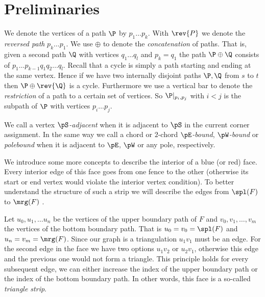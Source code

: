 
\section{Preliminaries}

  We denote the vertices of a path $\P$ by $p_1 \ldots p_k$.
  With $\rev{P}$ we denote the \emph{reversed path} $p_k \ldots p_1$. We use $\oplus$ to denote the \emph{concatenation} of paths. That is, given a second path $\Q$ with vertices $q_1 \ldots q_l$ and $p_k = q_1$ the path $\P \oplus \Q$ consists of $p_1 \ldots p_{k-1} q_1 q_2 \ldots q_l$.
  Recall that a cycle is simply a path starting and ending at the same vertex. Hence if we have two  internally disjoint paths $\P, \Q$ from $s$ to $t$ then $\P \oplus \rev{\Q}$ is a cycle.
  Furthermore we use a vertical bar to denote the \emph{restriction} of a path to a certain set of vertices. So $\P|_{p_i, p_j}$ with $i<j$ is the subpath of $\P$ with vertices $p_i \ldots p_j$.

  We call a vertex \emph{$\pS$-adjacent} when it is adjacent to $\pS$ in the current corner assignment. In the same way we call a chord or $2$-chord \emph{$\pE$-bound}, \emph{$\pW$-bound} or \emph{polebound} when it is adjacent to $\pE$, $\pW$ or any pole,  respectively.

  We introduce some more concepts to describe the interior of a blue (or red) face. Every interior edge of this face goes from one fence to the other (otherwise its start or end vertex would violate the interior vertex condition). To better understand the structure of such a strip we will describe the edges from $\spl(F)$ to $\mrg(F)$ .

  Let $u_0 , u_1, \ldots u_n$ be the vertices of the upper boundary path of $F$ and $v_0, v_1, \ldots, v_m$ the vertices of the bottom boundary path. That is $u_0=v_0 = \spl(F)$ and $u_n = v_m = \mrg(F)$. Since our graph is a triangulation $u_1v_1$ must be an edge. For the second edge in the face we have two options $u_1v_2$ or $u_2v_1$, otherwise this edge and the previous one would not form a triangle. This principle holds for every subsequent edge, we can either increase the index of the upper boundary path or the index of the bottom boundary path. In other words, this face is a so-called \emph{triangle strip}.


